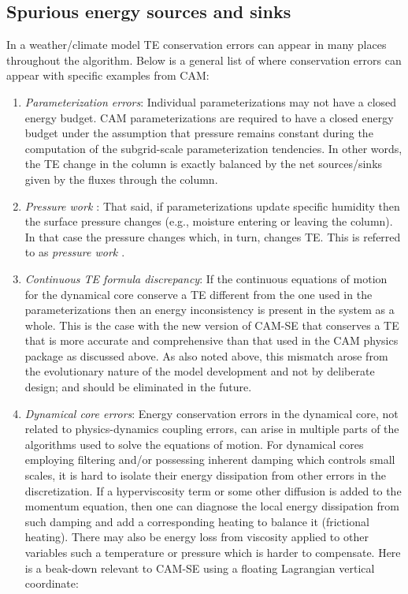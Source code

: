 \documentclass[draft,linenumbers]{agujournal}
\begin{document}
\subsection{Spurious energy sources and sinks}\label{subsec:spuriousE}
In a weather/climate model TE conservation errors can appear in many places throughout the algorithm. Below is a general list of where conservation errors can appear with specific examples from CAM:
\begin{enumerate}
\item {\em{Parameterization errors}}: Individual parameterizations may not have a closed energy budget. CAM parameterizations are required to have a closed energy budget under the assumption that pressure remains constant during the computation of the subgrid-scale parameterization tendencies. In other words, the TE change in the column is exactly balanced by the net sources/sinks given by the fluxes through the column. 
\item {\em{Pressure work {\color{red}{error}}}}: That said, if parameterizations update specific humidity then the surface pressure changes (e.g., moisture entering or leaving the column). In that case the pressure changes which, in turn, changes TE. This is referred to as {\em{pressure work {\color{red}{error}}}} \citep[section 3.1.8 in ][]{CAM5}.
\item {\em{Continuous TE formula discrepancy}}:  If the continuous equations of motion for the dynamical core conserve a TE different from the one used in the parameterizations then an energy inconsistency is present in the system as a whole. This is the case with the new version of CAM-SE that conserves a TE that is more accurate and comprehensive than that used in the CAM physics package as discussed above. As also noted above, this mismatch arose from the evolutionary nature of the model development and not by deliberate design; and should be eliminated in the future.
\item {\em{Dynamical core errors}}: {\color{red}{[mention that we assume that dynamical core is inherently mass conservative]}}Energy conservation errors in the dynamical core, not related to physics-dynamics coupling errors, can arise in multiple parts of the algorithms used to solve the equations of motion. For dynamical cores employing filtering \citep[e.g., limiters in flux operators ][]{L2004MWR} and/or possessing inherent damping which controls small scales, it is hard to isolate their energy dissipation from other errors in the discretization. If a hyperviscosity term or some other diffusion is added to the momentum equation, then one can diagnose the local energy dissipation from such damping and add a corresponding heating to balance it (frictional heating). There may also be energy loss from viscosity applied to other variables such a temperature or pressure which is harder to compensate. Here is a beak-down relevant to CAM-SE using a floating Lagrangian vertical coordinate:

\end{enumerate}
\end{document}
